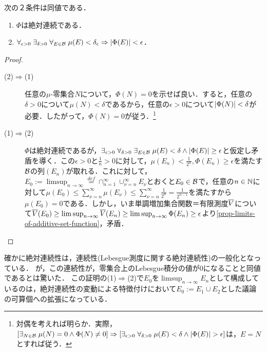 \documentclass[uplatex, dvipdfmx]{jsreport}
\begin{document}
\begin{theorem}
    次の２条件は同値である．
    \begin{enumerate}
        \item $\Phi$は絶対連続である．
        \item $\forall_{\epsilon>0}\;\exists_{\delta>0}\;\forall_{E\in\mathcal{B}}\;\mu(E)<\delta_\epsilon\Rightarrow\lvert\Phi(E)\rvert<\epsilon$．
    \end{enumerate}
\end{theorem}
\begin{proof}\mbox{}
    \begin{description}
        \item[(2)$\Rightarrow$(1)] 任意の$\mu$-零集合$N$について，$\Phi(N)=0$を示せば良い．すると，任意の$\delta>0$について$\mu(N)<\delta$であるから，任意の$\epsilon>0$について$\lvert\Phi(N)\rvert<\delta$が必要．したがって，$\Phi(N)=0$が従う．\footnote{対偶を考えれば明らか．実際，$[\exists_{N\in\mathcal{B}}\;\mu(N)=0\land\Phi(N)\ne 0]\Rightarrow[\exists_{\epsilon>0}\;\forall_{\delta>0}\;\mu(E)<\delta\land\lvert\Phi(E)\rvert>\epsilon]$は，$E=N$とすれば従う．}
        \item[(1)$\Rightarrow$(2)] $\Phi$は絶対連続であるが，$\exists_{\epsilon>0}\;\forall_{\delta>0}\;\exists_{E\in\mathcal{B}}\;\mu(E)<\delta\land\lvert\Phi(E)\rvert\ge\epsilon$と仮定し矛盾を導く．この$\epsilon>0$と$\frac{1}{n}>0$に対して，$\mu(E_n)<\frac{1}{2^n},\Phi(E_n)\ge\epsilon$を満たす$\mathcal{B}$の列$(E_n)$が取れる．これに対して，$E_0:=\limsup_{n\to\infty}\overset{def}{=}\cap_{n=1}^\infty\cup_{\nu=n}^\infty E_\nu$とおくと$E_0\in\mathcal{B}$で，任意の$n\in\mathbb{N}$に対して$\mu(E_0)\le\sum^\infty_{\nu=n}\mu(E_\nu)\le\sum^\infty_{\nu=n}\frac{1}{2^n}=\frac{1}{2^{n-1}}$を満たすから$\mu(E_0)=0$である．しかし，いま単調増加集合関数＝有限測度$\overline{V}$について$\overline{V}(E_0)\ge\limsup_{n\to\infty}\overline{V}(E_n)\ge\limsup_{n\to\infty}\Phi(E_n)\ge\epsilon$より\ref{prop-limits-of-additive-set-function}，矛盾．
    \end{description}
\end{proof}
\begin{remarks}
    確かに絶対連続性は，連続性(Lebesgue測度に関する絶対連続性)の一般化となっている．
    が，この連続性が，零集合上のLebesgue積分の値が$0$になることと同値であるとは驚いた．
    この証明の(1)$\Rightarrow$(2)で$E_0$を$\limsup_{n\to\infty}E_n$として構成しているのは，絶対連続性の変動による特徴付けにおいて$E_0:=E_1\cup E_2$とした議論の可算個への拡張になっている．
\end{remarks}
\end{document}
